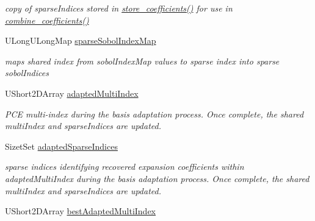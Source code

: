 \begin{DoxyCompactItemize}
\begin{DoxyCompactList}\small\item\em copy of sparse\+Indices stored in \hyperlink{classPecos_1_1RegressOrthogPolyApproximation_abc17a7104c33d8146f4a0ee7b6c6f37a}{store\+\_\+coefficients()} for use in \hyperlink{classPecos_1_1RegressOrthogPolyApproximation_a7c794213befc83c9f90137f22e4cd39d}{combine\+\_\+coefficients()} \end{DoxyCompactList}\item 
U\+Long\+U\+Long\+Map \hyperlink{classPecos_1_1RegressOrthogPolyApproximation_ac024e059bf921ce1d6aaf0506066b8a3}{sparse\+Sobol\+Index\+Map}\label{classPecos_1_1RegressOrthogPolyApproximation_ac024e059bf921ce1d6aaf0506066b8a3}

\begin{DoxyCompactList}\small\item\em maps shared index from sobol\+Index\+Map values to sparse index into sparse sobol\+Indices \end{DoxyCompactList}\item 
U\+Short2\+D\+Array \hyperlink{classPecos_1_1RegressOrthogPolyApproximation_ab55140ee7ed797ba62f79b641a42ecc4}{adapted\+Multi\+Index}\label{classPecos_1_1RegressOrthogPolyApproximation_ab55140ee7ed797ba62f79b641a42ecc4}

\begin{DoxyCompactList}\small\item\em P\+CE multi-\/index during the basis adaptation process. Once complete, the shared multi\+Index and sparse\+Indices are updated. \end{DoxyCompactList}\item 
Sizet\+Set \hyperlink{classPecos_1_1RegressOrthogPolyApproximation_abcffb72ea01fbd6efabd4f2a43f31acb}{adapted\+Sparse\+Indices}\label{classPecos_1_1RegressOrthogPolyApproximation_abcffb72ea01fbd6efabd4f2a43f31acb}

\begin{DoxyCompactList}\small\item\em sparse indices identifying recovered expansion coefficients within adapted\+Multi\+Index during the basis adaptation process. Once complete, the shared multi\+Index and sparse\+Indices are updated. \end{DoxyCompactList}\item 
U\+Short2\+D\+Array \hyperlink{classPecos_1_1RegressOrthogPolyApproximation_acd7822b6002b162f0f0b95e4a5022b36}{best\+Adapted\+Multi\+Index}\label{classPecos_1_1RegressOrthogPolyApproximation_acd7822b6002b162f0f0b95e4a5022b36}


\end{DoxyCompactItemize}
